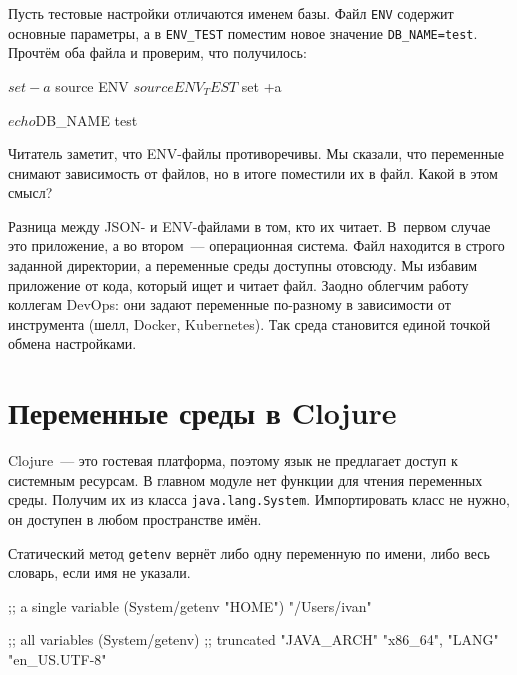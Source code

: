 Пусть тестовые настройки отличаются именем базы. Файл \verb|ENV| содержит
основные параметры, а в \verb|ENV_TEST| поместим новое значение
\verb|DB_NAME=test|. Прочтём оба файла и проверим, что получилось:

\begin{english}
  \begin{bash}
$ set -a
$ source ENV
$ source ENV_TEST
$ set +a

$ echo $DB_NAME
test
  \end{bash}
\end{english}

Читатель заметит, что ENV-файлы противоречивы. Мы сказали, что переменные
снимают зависимость от файлов, но в итоге поместили их в файл. Какой в этом
смысл?


Разница между JSON- и ENV-файлами в том, кто их читает. В~первом случае это
приложение, а во втором~--- операционная система. Файл находится в строго
заданной директории, а переменные среды доступны отовсюду. Мы избавим
приложение от кода, который ищет и читает файл. Заодно облегчим работу коллегам
DevOps: они задают переменные по-разному в зависимости от инструмента (шелл,
Docker, Kubernetes). Так среда становится единой точкой обмена настройками.

\section{Переменные среды в Clojure}


Clojure~--- это гостевая платформа, поэтому язык не предлагает доступ к системным
ресурсам. В главном модуле нет функции для чтения переменных среды. Получим их
из класса \verb|java.lang.System|. Импортировать класс не нужно, он доступен в
любом пространстве имён.

Статический метод \verb|getenv| вернёт либо одну переменную по имени, либо
весь словарь, если имя не указали.

\ifx\devicetype\mobile

\begin{english}
  \begin{clojure}
;; a single variable
(System/getenv "HOME")
"/Users/ivan"

;; all variables
(System/getenv)
;; truncated
{"JAVA_ARCH" "x86_64",
 "LANG" "en_US.UTF-8"}
  \end{clojure}
\end{english}

